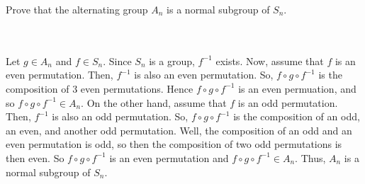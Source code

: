 Prove that the alternating group $A_n$ is a normal subgroup of $S_n$.\\\\

\begin{solution}\renewcommand{\qedsymbol}{}\ \\
    Let $g\in A_n$ and $f\in S_n$. Since $S_n$ is a group, $f^{-1}$ exists. Now, assume that $f$ is an
    even permutation. Then, $f^{-1}$ is also an even permutation. So, $f\circ g\circ f^{-1}$ is the
    composition of 3 even permutations. Hence $f\circ g\circ f^{-1}$ is an even permuation, and so
    $f\circ g\circ f^{-1}\in A_n$. On the other hand, assume that $f$ is an odd permutation. Then,
    $f^{-1}$ is also an odd permutation. So, $f\circ g\circ f^{-1}$ is the composition of an odd, an
    even, and another odd permutation. Well, the composition of an odd and an even permutation is odd,
    so then the composition of two odd permutations is then even. So $f\circ g\circ f^{-1}$ is an even
    permutation and $f\circ g\circ f^{-1}\in A_n$. Thus, $A_n$ is a normal subgroup of $S_n$.


\end{solution}